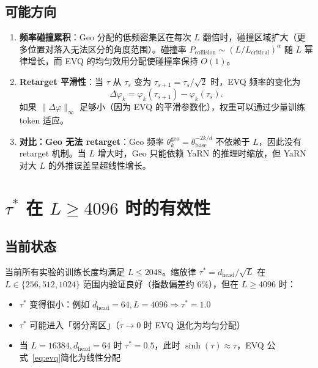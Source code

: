 \documentclass[11pt,a4paper]{article}
\newcommand{\zh}[1]{{\zhfont #1}}
\begin{document}
\subsection*{\zh{可能方向}}
\begin{enumerate}[leftmargin=2em]
  \item \textbf{\zh{频率碰撞累积}}\zh{：}Geo \zh{分配的低频密集区在每次} $L$ \zh{翻倍时，碰撞区域扩大（更多位置对落入无法区分的角度范围）。碰撞率} $P_{\mathrm{collision}} \sim (L/L_{\mathrm{critical}})^\alpha$ \zh{随} $L$ \zh{幂律增长，而} EVQ \zh{的均匀效用分配使碰撞率保持} $O(1)$\zh{。}
  \item \textbf{Retarget \zh{平滑性}}\zh{：当} $\tau$ \zh{从} $\tau_s$ \zh{变为} $\tau_{s+1} = \tau_s/\sqrt{2}$ \zh{时，}EVQ \zh{频率的变化为}
  \begin{equation}
    \Delta\varphi_k = \varphi_k(\tau_{s+1}) - \varphi_k(\tau_s).
  \end{equation}
  \zh{如果} $\|\Delta\varphi\|_\infty$ \zh{足够小（因为} EVQ \zh{的平滑参数化），权重可以通过少量训练} token \zh{适应。}
  \item \textbf{\zh{对比：}Geo \zh{无法} retarget}\zh{：}Geo \zh{频率} $\theta_k^{\mathrm{geo}} = \theta_{\mathrm{base}}^{-2k/d}$ \zh{不依赖于} $L$\zh{，因此没有} retarget \zh{机制。当} $L$ \zh{增大时，}Geo \zh{只能依赖} YaRN \zh{的推理时缩放，但} YaRN \zh{对大} $L$ \zh{的外推误差呈超线性增长。}
\end{enumerate}

\vspace{12pt}

\section{$\tau^*$ \zh{在} $L \geq 4096$ \zh{时的有效性}}

\subsection*{\zh{当前状态}}
\zh{当前所有实验的训练长度均满足} $L \leq 2048$\zh{。缩放律} $\tau^* = d_{\mathrm{head}}/\sqrt{L}$ \zh{在} $L \in \{256, 512, 1024\}$ \zh{范围内验证良好（指数偏差约} 6\%\zh{），但在} $L \geq 4096$ \zh{时：}
\begin{itemize}[leftmargin=2em]
  \item $\tau^*$ \zh{变得很小：例如} $d_{\mathrm{head}}=64, L=4096 \Rightarrow \tau^* = 1.0$
  \item $\tau^*$ \zh{可能进入「弱分离区」（}$\tau \to 0$ \zh{时} EVQ \zh{退化为均匀分配）}
  \item \zh{当} $L=16384, d_{\mathrm{head}}=64$ \zh{时} $\tau^* = 0.5$\zh{，此时} $\sinh(\tau) \approx \tau$\zh{，}EVQ \zh{公式~\eqref{eq:evq}简化为线性分配}
\end{itemize}
\end{document}
